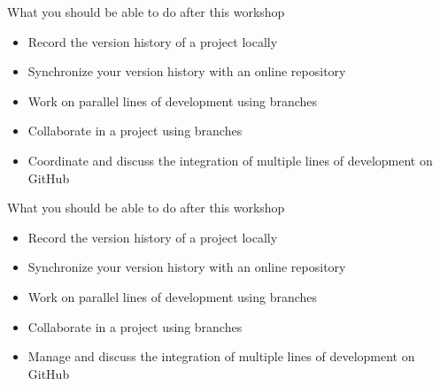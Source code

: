 \documentclass[handout]{beamer}
\begin{document}
\begin{frame}{What you should be able to do after this workshop}
\begin{itemize}
	\item Record the version history of a project locally
	\item Synchronize your version history with an online repository
	\item Work on parallel lines of development using branches
	\item Collaborate in a project using branches
	\item Coordinate and discuss the integration of multiple lines of development on GitHub
\end{itemize}
\end{frame}

\begin{frame}{What you should be able to do after this workshop}
\begin{itemize}
	\item Record the version history of a project locally
	\item Synchronize your version history with an online repository
	\item Work on parallel lines of development using branches
	\item Collaborate in a project using branches
	\item Manage and discuss the integration of multiple lines of development on GitHub
\end{itemize}
\end{frame}
\end{document}
